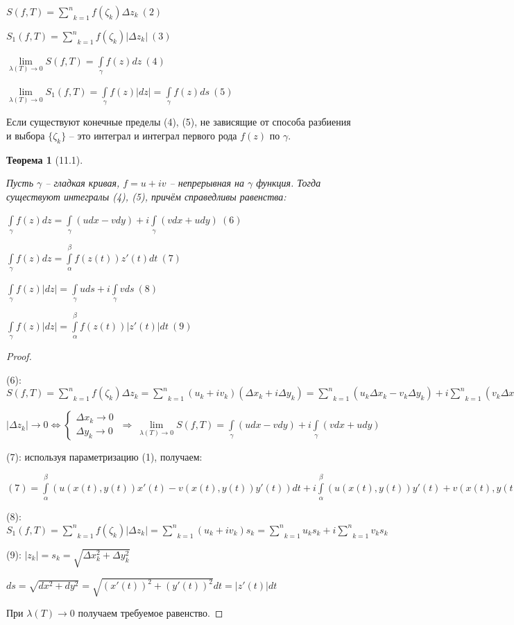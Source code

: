 \documentclass[draft]{report}
\newcommand{\forcenewline}{$\phantom{\mbox{newline}}$\newline}
\newcommand{\then}{\ \Rightarrow\ }
\newcommand{\mint}[2]{\underset{#1}{\overset{#2}{\int}}}
\newcommand{\msum}[2]{\underset{#1}{\overset{#2}{\sum}}}
\newcommand{\mlim}[1]{\underset{#1}{\lim}}
\newcommand{\LRA}{\Leftrightarrow}
\renewcommand{\a}{\alpha}
\renewcommand{\b}{\beta}
\newcommand{\g}{\gamma}
\renewcommand{\l}{\lambda}
\newcommand{\D}{\Delta}
\newcommand{\sys}[1]{\left\{\begin{matrix}#1\end{matrix}\right.}
\newtheorem*{theor}{Теорема}
\theoremstyle{remark}
\begin{document}
$S(f,T)=\msum{k=1}{n}f(\zeta_k)\D z_k\ (2)$

$S_1(f,T)=\msum{k=1}{n}f(\zeta_k)|\D z_k|\ (3)$

$\mlim{\l(T)\to 0}S(f,T)=\mint{\g}{} f(z)dz\ (4)$

$\mlim{\l(T)\to 0}S_1(f,T)=\mint{\g}{} f(z)|dz|=\mint{\g}{} f(z)ds\ (5)$

Если существуют конечные пределы (4), (5), не зависящие от способа разбиения и выбора $\{\zeta_k\}$ -- это интеграл и интеграл первого рода $f(z)$ по $\g$.

\begin{theor}[11.1]
\forcenewline

Пусть $\g$ -- гладкая кривая, $f=u+iv$ -- непрерывная на $\g$ функция. Тогда существуют интегралы (4), (5), причём справедливы равенства:

$\mint{\g}{}f(z)dz=\mint{\g}{}(udx-vdy)+i\mint{\g}{}(vdx+udy)\ (6)$

$\mint{\g}{}f(z)dz=\mint{\a}{\b}f(z(t))z'(t)dt\ (7)$

$\mint{\g}{}f(z)|dz|=\mint{\g}{}uds+i\mint{\g}{}vds\ (8)$

$\mint{\g}{}f(z)|dz|=\mint{\a}{\b}f(z(t))|z'(t)|dt\ (9)$
\end{theor}
\begin{proof}
\forcenewline

(6): $S(f,T)=\msum{k=1}{n}f(\zeta_k)\D z_k=\msum{k=1}{n}(u_k+iv_k)(\D x_k+i\D y_k)=\msum{k=1}{n}(u_k\D x_k-v_k\D y_k)+i\msum{k=1}{n}(v_k\D x_k+u_k\D y_k)$

$|\D z_k|\to 0 \LRA\sys{\D x_k\to 0 \\ \D y_k\to 0}\then \mlim{\l(T)\to 0}S(f,T)=\mint{\g}{}(udx-vdy)+i\mint{\g}{}(vdx+udy)$

(7): используя параметризацию (1), получаем:

$(7)=\mint\a\b(u(x(t),y(t))x'(t)-v(x(t),y(t))y'(t))dt+i\mint\a\b(u(x(t),y(t))y'(t)+v(x(t),y(t))x'(t))dt=\mint\a\b(u+iv)(x'+iy')=\mint\a\b f(z(t))z'(t)dt$

(8): $S_1(f,T)=\msum{k=1}{n}f(\zeta_k)|\D z_k|=\msum{k=1}{n}(u_k+iv_k)s_k=\msum{k=1}{n}u_ks_k+i\msum{k=1}{n}v_ks_k$

(9): $|z_k|=s_k=\sqrt{\D x_k^2+\D y_k^2}$

$ds=\sqrt{dx^2+dy^2}=\sqrt{(x'(t))^2+(y'(t))^2}dt=|z'(t)|dt$

При $\l(T)\to 0$ получаем требуемое равенство.
\end{proof}
\end{document}
